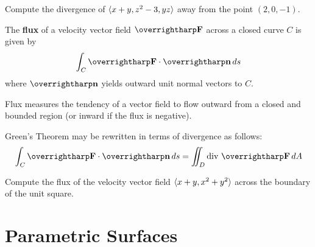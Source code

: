 \documentclass[letterpaper, twoside, 12pt]{book}
\begin{document}
          \begin{problem}
            Compute the divergence of $\langle x+y,z^2-3,yz\rangle$ away from the point
            $(2,0,-1)$.
          \end{problem}

          \begin{solution}

          \end{solution}

          \begin{contributors}

          \end{contributors}

\begin{definition}
  The \textbf{flux} of a velocity vector field $\vect{F}$ across a closed
  curve $C$ is given by
  \[
    \int_C \vect{F}\cdot\vect{n}\dvar{s}
  \]
  where $\vect n$ yields outward unit normal vectors to $C$.
\end{definition}

\begin{remark}
  Flux measures the tendency of a vector field to flow outward from
  a closed and bounded region (or inward if the flux is negative).
\end{remark}

\begin{theorem}
  Green's Theorem may be rewritten in terms of divergence as follows:
  \[
    \int_C \vect{F}\cdot\vect{n}\dvar{s}
      =
    \iint_D \text{div }\vect{F} \dvar{A}
  \]
\end{theorem}

          \begin{problem}
            Compute the flux of the velocity vector field
            $\langle x+y,x^2+y^2\rangle$ across the boundary of the unit square.
          \end{problem}

          \begin{solution}

          \end{solution}

          \begin{contributors}

          \end{contributors}

\section{Parametric Surfaces} %
\end{document}
